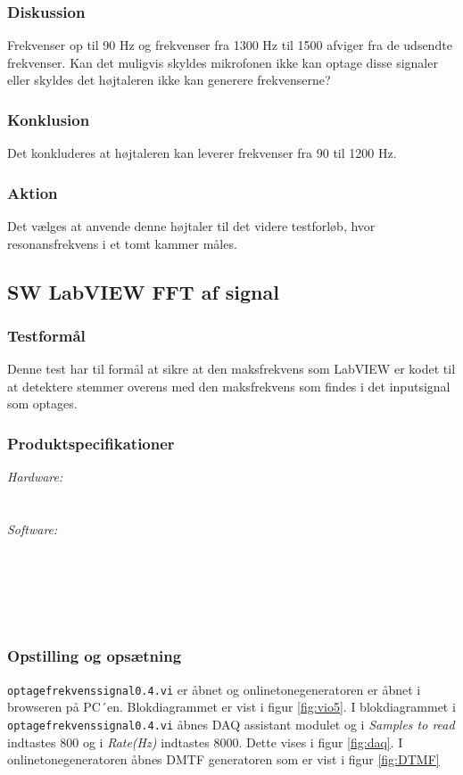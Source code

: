 		\subsubsection{Diskussion} 
		Frekvenser op til 90 Hz og frekvenser fra 1300 Hz til 1500 afviger fra de udsendte frekvenser. Kan det muligvis skyldes mikrofonen ikke kan optage disse signaler eller skyldes det højtaleren ikke kan generere frekvenserne? 
		\subsubsection{Konklusion}
	Det konkluderes at højtaleren kan leverer frekvenser fra 90 til 1200 Hz. 
	    \subsubsection{Aktion}
	    Det vælges at anvende denne højtaler til det videre testforløb, hvor resonansfrekvens i et tomt kammer måles. 
	    
\subsection{SW LabVIEW FFT af signal}	
\subsubsection{Testformål}
		Denne test har til formål at sikre at den maksfrekvens som LabVIEW er kodet til at detektere stemmer overens med den maksfrekvens som findes i det inputsignal som optages.  
		\subsubsection{Produktspecifikationer}
	
		\textit{Hardware:}\\
		\PC\\
		\daq\\
	
		\textit{Software:}\\
		\labview\\
		\visa\\
		\vi\\
		\daqsoft\\
		\onlineg\\ 
	
		\subsubsection{Opstilling og opsætning}
		\texttt{optagefrekvenssignal0.4.vi} er åbnet og onlinetonegeneratoren er åbnet i browseren på PC´en. Blokdiagrammet er vist i figur \ref{fig:vio5}. I blokdiagrammet i \texttt{optagefrekvenssignal0.4.vi} åbnes DAQ assistant modulet og i \textit{Samples to read} indtastes 800 og i \textit{Rate(Hz)} indtastes 8000. Dette vises i figur \ref{fig:daq}.   
		 I onlinetonegeneratoren åbnes DMTF generatoren som er vist i figur \ref{fig:DTMF}  
		
